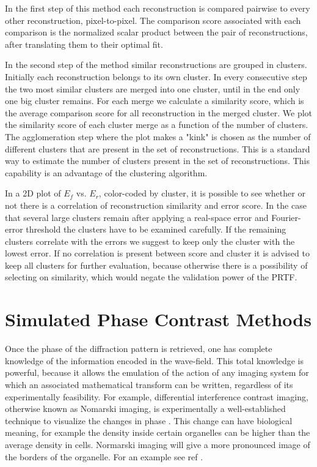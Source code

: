 In the first step of this method each reconstruction is compared pairwise to every other reconstruction, pixel-to-pixel. The comparison score associated with each comparison is the normalized scalar product between the pair of reconstructions, after translating them to their optimal fit. 

In the second step of the method similar reconstructions are grouped in clusters. Initially each reconstruction belongs to its own cluster. In every consecutive step the two most similar clusters are merged into one cluster, until in the end only one big cluster remains. For each merge we calculate a similarity score, which is the average comparison score for all reconstruction in the merged cluster. We plot the similarity score of each cluster merge as a function of the number of clusters. The agglomeration step where the plot makes a "kink" is chosen as the number of different clusters that are present in the set of reconstructions. This is a standard way to estimate the number of clusters present in the set of reconstructions. This capability is an advantage of the  clustering algorithm. 

In a 2D plot of $E_f$ vs. $E_r$, color-coded by cluster, it is possible to see whether or not there is a correlation of reconstruction similarity and error score.  In the case that several large clusters remain after applying a real-space error and Fourier-error threshold the clusters have to be examined carefully. If the remaining clusters correlate with the errors we suggest to keep only the cluster with the lowest error. If no correlation is present between score and cluster it is advised to keep all clusters for further evaluation, because otherwise there is a possibility of selecting on similarity, which would negate the validation power of the PRTF.

 
\section{Simulated Phase Contrast Methods}
Once the phase of the diffraction pattern is retrieved, one has complete knowledge of the information encoded in the  wave-field. This total knowledge is powerful, because it allows the emulation of the action of any imaging system for which an associated mathematical transform can be written, regardless of its experimentally feasibility.
For example, differential interference contrast imaging, otherwise known as Nomarski imaging, is experimentally a well-established technique to visualize the changes in phase \cite{Nomarski1955)}. This change can have biological meaning, for example the density inside certain organelles can be higher than the average density in cells. Normarski imaging will give a more pronounced image of the borders of the organelle. For an example see ref \cite{Barty1998}. 

